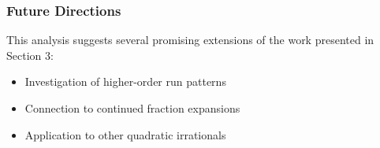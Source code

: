 \subsubsection{Future Directions}
This analysis suggests several promising extensions of the work presented in Section 3:

\begin{itemize}
    \item Investigation of higher-order run patterns
    \item Connection to continued fraction expansions
    \item Application to other quadratic irrationals
\end{itemize}